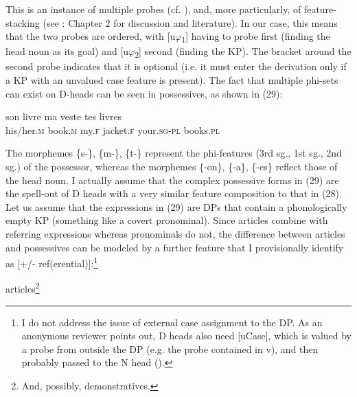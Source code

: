 \documentclass[output=paper]{langsci/langscibook}
\begin{document}
This is an instance of multiple probes (cf. \citealt{Chomsky2008}), and, more particularly, of feature-stacking (see \citealt{Manetta2011}: Chapter 2 for discussion and literature). In our case, this means that the two probes are ordered, with [u$\varphi $\textsubscript{1}] having to probe first (finding the head noun as its goal) and [u$\varphi $\textsubscript{2}] second (finding the KP). The bracket around the second probe indicates that it is optional (i.e. it must enter the derivation only if a KP with an unvalued case feature is present). The fact that multiple phi-sets can exist on D-heads can be seen in  possessives, as shown in (29):

\ea%
    \label{ex:mensch:29}
    \gll   son    livre   \hspace{1.5em} ma  veste  \hspace{1.5em}  tes    livres\\
           his/her.\textsc{m}  book.\textsc{m} {} my.\textsc{f}  jacket.\textsc{f} {} your.\textsc{sg-pl}  books.\textsc{pl}\\
\z

The morphemes \{s-\}, \{m-\}, \{t-\} represent the phi-features (3rd sg., 1st sg., 2nd sg.) of the possessor, whereas the morphemes \{-on\}, \{-a\}, \{-es\} reflect those of the head noun. I actually assume that the complex possessive forms in (29) are the spell-out of D heads with a very similar feature composition to that in (28). Let us assume that the expressions in (29) are DPs that contain a phonologically empty KP (something like a covert pronominal). Since articles combine with referring expressions whereas pronominals do not, the difference between articles and possessives can be modeled by a further feature that I provisionally identify as [+/- ref(erential)]:\footnote{I do not address the issue of external case assignment to the DP. As an anonymous reviewer points out, D heads also need [uCase], which is valued by a probe from outside the DP (e.g. the probe contained in v), and then probably passed to the N head ().}

\ea%
    \label{ex:mensch:30}
    \ea articles\footnote{And, possibly, demonstratives.}\\\relax
        
\end{document}
